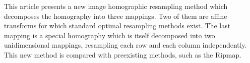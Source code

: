 This article presents a new  image homographic resampling method which decomposes the homography into three mappings. Two of them are affine transforms for which standard optimal resampling methods exist. The last mapping is a special homography which is itself decomposed into  two unidimensional mappings, resampling each row and  each column independently. This new method is compared with preexisting methods, such as the Ripmap.






